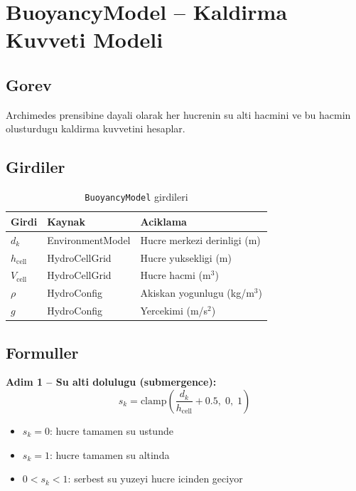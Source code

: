 \documentclass[12pt,a4paper]{article}
\begin{document}
\section{BuoyancyModel -- Kaldirma Kuvveti Modeli}

\subsection{Gorev}

Archimedes prensibine dayali olarak her hucrenin su alti hacmini ve bu
hacmin olusturdugu kaldirma kuvvetini hesaplar.

\subsection{Girdiler}

\begin{table}[H]
  \centering
  \caption{\texttt{BuoyancyModel} girdileri}
  \begin{tabularx}{\linewidth}{llX}
    \toprule
    \textbf{Girdi} & \textbf{Kaynak} & \textbf{Aciklama} \\
    \midrule
    $d_k$ & EnvironmentModel & Hucre merkezi derinligi (m) \\
    $h_{\text{cell}}$ & HydroCellGrid & Hucre yuksekligi (m) \\
    $V_{\text{cell}}$ & HydroCellGrid & Hucre hacmi (m$^3$) \\
    $\rho$ & HydroConfig & Akiskan yogunlugu (kg/m$^3$) \\
    $g$ & HydroConfig & Yercekimi (m/s$^2$) \\
    \bottomrule
  \end{tabularx}
\end{table}

\subsection{Formuller}

\textbf{Adim 1 -- Su alti dolulugu (submergence):}
\begin{equation}
  \boxed{
  s_k = \mathrm{clamp}\!\left(\frac{d_k}{h_{\text{cell}}} + 0.5,\; 0,\; 1\right)
  }
  \label{eq:submergence}
\end{equation}

\begin{itemize}
  \item $s_k = 0$: hucre tamamen su ustunde
  \item $s_k = 1$: hucre tamamen su altinda
  \item $0 < s_k < 1$: serbest su yuzeyi hucre icinden geciyor
\end{itemize}
\end{document}
